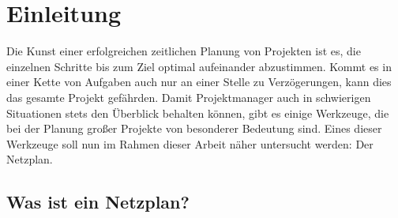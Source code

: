 \chapter{Einleitung}
\label{Einleitung}

Die Kunst einer erfolgreichen zeitlichen Planung von Projekten ist es, die
einzelnen Schritte bis zum Ziel optimal aufeinander abzustimmen. Kommt
es in einer Kette von Aufgaben auch nur an einer Stelle zu
Verz\"ogerungen, kann dies das gesamte Projekt gef\"ahrden. Damit
Projektmanager auch in schwierigen Situationen stets den \"Uberblick
behalten k\"onnen, gibt es einige Werkzeuge, die bei der Planung gro{\ss}er
Projekte von besonderer Bedeutung sind. Eines dieser Werkzeuge soll
nun im Rahmen dieser Arbeit n\"aher untersucht werden: Der Netzplan.

\section{Was ist ein Netzplan?}

